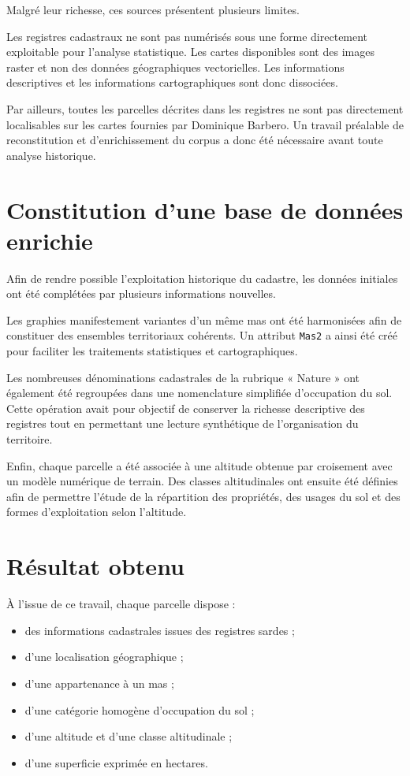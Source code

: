 \documentclass[12pt,a4paper]{report}
\begin{document}
Malgré leur richesse, ces sources présentent plusieurs limites.

Les registres cadastraux ne sont pas numérisés sous une forme directement exploitable pour l'analyse statistique. Les cartes disponibles sont des images raster et non des données géographiques vectorielles. Les informations descriptives et les informations cartographiques sont donc dissociées.

Par ailleurs, toutes les parcelles décrites dans les registres ne sont pas directement localisables sur les cartes fournies par Dominique Barbero. Un travail préalable de reconstitution et d'enrichissement du corpus a donc été nécessaire avant toute analyse historique.

\section{Constitution d'une base de données enrichie}

Afin de rendre possible l'exploitation historique du cadastre, les données initiales ont été complétées par plusieurs informations nouvelles.

Les graphies manifestement variantes d'un même mas ont été harmonisées afin de constituer des ensembles territoriaux cohérents. Un attribut \texttt{Mas2} a ainsi été créé pour faciliter les traitements statistiques et cartographiques.

Les nombreuses dénominations cadastrales de la rubrique « Nature » ont également été regroupées dans une nomenclature simplifiée d'occupation du sol. Cette opération avait pour objectif de conserver la richesse descriptive des registres tout en permettant une lecture synthétique de l'organisation du territoire.

Enfin, chaque parcelle a été associée à une altitude obtenue par croisement avec un modèle numérique de terrain. Des classes altitudinales ont ensuite été définies afin de permettre l'étude de la répartition des propriétés, des usages du sol et des formes d'exploitation selon l'altitude.

\section{Résultat obtenu}

À l'issue de ce travail, chaque parcelle dispose :

\begin{itemize}
	\item des informations cadastrales issues des registres sardes ;
	\item d'une localisation géographique ;
	\item d'une appartenance à un mas ;
	\item d'une catégorie homogène d'occupation du sol ;
	\item d'une altitude et d'une classe altitudinale ;
	\item d'une superficie exprimée en hectares.
\end{itemize}
\end{document}
